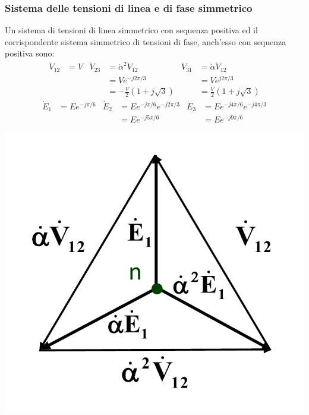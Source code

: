 \documentclass{article}
\begin{document}
\subsubsection{Sistema delle tensioni di linea e di fase simmetrico}
Un sistema di tensioni di linea simmetrico con
sequenza positiva ed il corrispondente sistema
simmetrico di tensioni di fase, anch'esso con
sequenza positiva sono:
\begin{align*}
    \dot V_{12} &= V
    &
    \dot V_{23} &= \dot \alpha^2 \dot V_{12}
    &
    \dot V_{31} &= \dot \alpha \dot V_{12}
    \\
    & &
    &=V e^{-j 2 \pi /3}
    &
    &= V e^{j 2 \pi /3}
    \\
    & &
    &= - \frac{V}{2} \left(1+j \sqrt{3}\right)
    &
    &= \frac{V}{2} \left(1+j \sqrt{3}\right)
\end{align*}
\begin{align*}
    \dot E_1 &= E e^{-j \pi /6}
    &
    \dot E_2 &= E e^{-j \pi /6} e^{-j 2\pi /3}
    &
    \dot E_3 &= E e^{-j 4\pi /6} e^{-j 4\pi /3}
    \\
    & & 
    &=E e^{-j 5\pi /6}
    &
    &= E e^{-j 9\pi /6}
\end{align*}
\begin{center}
    \includegraphics[scale=0.27]{Image/Sistema_tensioni_linea_fase_simmetrico.png}
\end{center}
\end{document}
